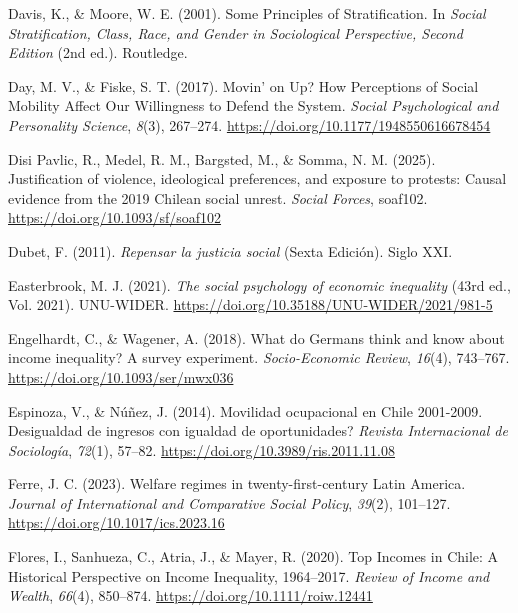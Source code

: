 \documentclass[
  12pt,
]{article}
\newlength{\cslhangindent}
\newenvironment{CSLReferences}[2] %
 {\begin{list}{}{%
  \setlength{\itemindent}{0pt}
  \setlength{\leftmargin}{0pt}
  \setlength{\parsep}{0pt}
  \ifodd #1
   \setlength{\leftmargin}{\cslhangindent}
   \setlength{\itemindent}{-1\cslhangindent}
  \fi
  \setlength{\itemsep}{#2\baselineskip}}}
 {\end{list}}
\begin{document}
\begin{CSLReferences}{1}{0}
Davis, K., \& Moore, W. E. (2001). Some {Principles} of
{Stratification}. In \emph{Social {Stratification}, {Class}, {Race}, and
{Gender} in {Sociological Perspective}, {Second Edition}} (2nd ed.).
Routledge.

Day, M. V., \& Fiske, S. T. (2017). Movin' on {Up}? {How Perceptions} of
{Social Mobility Affect Our Willingness} to {Defend} the {System}.
\emph{Social Psychological and Personality Science}, \emph{8}(3),
267--274. \url{https://doi.org/10.1177/1948550616678454}

Disi Pavlic, R., Medel, R. M., Bargsted, M., \& Somma, N. M. (2025).
Justification of violence, ideological preferences, and exposure to
protests: Causal evidence from the 2019 {Chilean} social unrest.
\emph{Social Forces}, soaf102. \url{https://doi.org/10.1093/sf/soaf102}

Dubet, F. (2011). \emph{{Repensar la justicia social}} (Sexta
Edici{ó}n). Siglo XXI.

Easterbrook, M. J. (2021). \emph{The social psychology of economic
inequality} (43rd ed., Vol. 2021). UNU-WIDER.
\url{https://doi.org/10.35188/UNU-WIDER/2021/981-5}

Engelhardt, C., \& Wagener, A. (2018). What do {Germans} think and know
about income inequality? {A} survey experiment. \emph{Socio-Economic
Review}, \emph{16}(4), 743--767.
\url{https://doi.org/10.1093/ser/mwx036}

Espinoza, V., \& Núñez, J. (2014). Movilidad ocupacional en {Chile}
2001-2009. {\textquestiondown}{Desigualdad} de ingresos con igualdad de
oportunidades? \emph{Revista Internacional de Sociolog{í}a},
\emph{72}(1), 57--82. \url{https://doi.org/10.3989/ris.2011.11.08}

Ferre, J. C. (2023). Welfare regimes in twenty-first-century {Latin
America}. \emph{Journal of International and Comparative Social Policy},
\emph{39}(2), 101--127. \url{https://doi.org/10.1017/ics.2023.16}

Flores, I., Sanhueza, C., Atria, J., \& Mayer, R. (2020). Top {Incomes}
in {Chile}: {A Historical Perspective} on {Income Inequality},
1964--2017. \emph{Review of Income and Wealth}, \emph{66}(4), 850--874.
\url{https://doi.org/10.1111/roiw.12441}


\end{CSLReferences}
\end{document}
